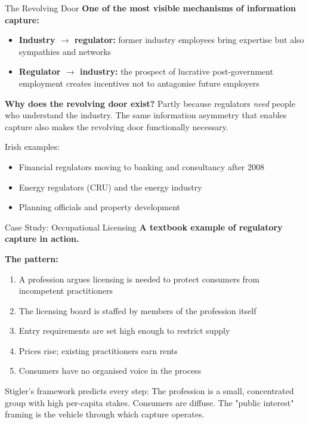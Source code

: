 \documentclass[10pt]{beamer}
\begin{document}
\begin{frame}{The Revolving Door}
\textbf{One of the most visible mechanisms of information capture:}

\vspace{0.1cm}
\begin{itemize}
\item \textbf{Industry $\rightarrow$ regulator:} former industry employees bring expertise but also sympathies and networks
\item \textbf{Regulator $\rightarrow$ industry:} the prospect of lucrative post-government employment creates incentives not to antagonise future employers
\end{itemize}

\vspace{0.1cm}
\textbf{Why does the revolving door exist?}
Partly because regulators \emph{need} people who understand the industry.
The same information asymmetry that enables capture also makes the revolving door functionally necessary.

\vspace{0.1cm}
\alert{Irish examples:}
\begin{itemize}
\item Financial regulators moving to banking and consultancy after 2008
\item Energy regulators (CRU) and the energy industry
\item Planning officials and property development
\end{itemize}
\end{frame}


\begin{frame}{Case Study: Occupational Licensing}
\textbf{A textbook example of regulatory capture in action.}

\vspace{0.1cm}
\textbf{The pattern:}
\begin{enumerate}
\item A profession argues licensing is needed to protect consumers from incompetent practitioners
\item The licensing board is staffed by members of the profession itself
\item Entry requirements are set high enough to restrict supply
\item Prices rise; existing practitioners earn rents
\item Consumers have no organised voice in the process
\end{enumerate}

\vspace{0.1cm}
\alert{Stigler's framework predicts every step:}
The profession is a small, concentrated group with high per-capita stakes.
Consumers are diffuse.
The "public interest" framing is the vehicle through which capture operates.
\end{frame}
\end{document}
